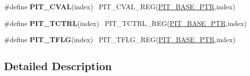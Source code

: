 \begin{DoxyCompactItemize}
\item 
\hypertarget{group___p_i_t___register___accessor___macros_ga1f704e3151c143875a7e5b7885d40401}{}\#define {\bfseries P\+I\+T\+\_\+\+C\+V\+A\+L}(index)                                                ~P\+I\+T\+\_\+\+C\+V\+A\+L\+\_\+\+R\+E\+G(\hyperlink{group___p_i_t___peripheral_ga70be45f58402a8e6d2ce4df7b23aa41c}{P\+I\+T\+\_\+\+B\+A\+S\+E\+\_\+\+P\+T\+R},index)\label{group___p_i_t___register___accessor___macros_ga1f704e3151c143875a7e5b7885d40401}

\item 
\hypertarget{group___p_i_t___register___accessor___macros_ga1e01a4d06bd01661e9e0c6a6be5cd289}{}\#define {\bfseries P\+I\+T\+\_\+\+T\+C\+T\+R\+L}(index)                                              ~P\+I\+T\+\_\+\+T\+C\+T\+R\+L\+\_\+\+R\+E\+G(\hyperlink{group___p_i_t___peripheral_ga70be45f58402a8e6d2ce4df7b23aa41c}{P\+I\+T\+\_\+\+B\+A\+S\+E\+\_\+\+P\+T\+R},index)\label{group___p_i_t___register___accessor___macros_ga1e01a4d06bd01661e9e0c6a6be5cd289}

\item 
\hypertarget{group___p_i_t___register___accessor___macros_ga69836a5d28fbefe3eeac99190be5af1f}{}\#define {\bfseries P\+I\+T\+\_\+\+T\+F\+L\+G}(index)                                                ~P\+I\+T\+\_\+\+T\+F\+L\+G\+\_\+\+R\+E\+G(\hyperlink{group___p_i_t___peripheral_ga70be45f58402a8e6d2ce4df7b23aa41c}{P\+I\+T\+\_\+\+B\+A\+S\+E\+\_\+\+P\+T\+R},index)\label{group___p_i_t___register___accessor___macros_ga69836a5d28fbefe3eeac99190be5af1f}

\end{DoxyCompactItemize}


\subsection{Detailed Description}
